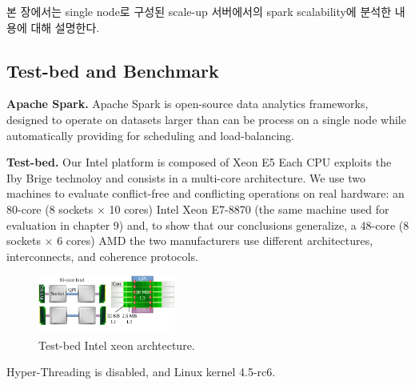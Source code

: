 \ifkor
본 장에서는 single node로 구성된 scale-up 서버에서의 spark scalability에
분석한 내용에 대해 설명한다. 
\else

\fi



\subsection{Test-bed and Benchmark}

\ifkor
\noindent
\textbf{Apache Spark. }
Apache Spark is open-source data analytics frameworks, designed to operate on
datasets larger than can be process on a single node while automatically
providing for scheduling and load-balancing.
\else

\fi

\ifkor
\noindent
\textbf{Test-bed. }
Our Intel platform is composed of Xeon E5 Each CPU exploits the Iby Brige
technoloy and consists in a multi-core architecture.
We use two machines to evaluate conflict-free and conflicting operations on real hardware: an
80-core (8 sockets × 10 cores) Intel Xeon E7-8870 (the same machine used for evaluation in
chapter 9) and, to show that our conclusions generalize, a 48-core (8 sockets × 6 cores) AMD
the two manufacturers use different architectures, interconnects, and coherence protocols.

\begin{figure}[h]
  \begin{center}
     \includegraphics[width=0.4\textwidth]{fig/xeon}
  \end{center}
  \caption{Test-bed Intel xeon archtecture.}
  \label{fig:basic}
\end{figure}
Hyper-Threading is disabled, and Linux kernel 4.5-rc6.
\else

